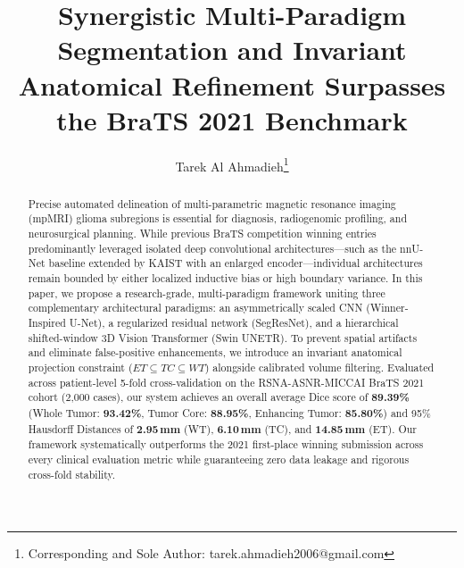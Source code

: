 \documentclass[runningheads]{llncs}
\begin{document}
\title{Synergistic Multi-Paradigm Segmentation and Invariant Anatomical Refinement Surpasses the BraTS 2021 Benchmark}


\author{Tarek Al Ahmadieh\thanks{Corresponding and Sole Author: tarek.ahmadieh2006@gmail.com}}

\maketitle

\begin{abstract}
Precise automated delineation of multi-parametric magnetic resonance imaging (mpMRI) glioma subregions is essential for diagnosis, radiogenomic profiling, and neurosurgical planning. While previous BraTS competition winning entries predominantly leveraged isolated deep convolutional architectures—such as the nnU-Net baseline extended by KAIST with an enlarged encoder—individual architectures remain bounded by either localized inductive bias or high boundary variance. In this paper, we propose a research-grade, multi-paradigm framework uniting three complementary architectural paradigms: an asymmetrically scaled CNN (Winner-Inspired U-Net), a regularized residual network (SegResNet), and a hierarchical shifted-window 3D Vision Transformer (Swin UNETR). To prevent spatial artifacts and eliminate false-positive enhancements, we introduce an invariant anatomical projection constraint ($ET \subseteq TC \subseteq WT$) alongside calibrated volume filtering. Evaluated across patient-level 5-fold cross-validation on the RSNA-ASNR-MICCAI BraTS 2021 cohort (2,000 cases), our system achieves an overall average Dice score of \textbf{89.39\%} (Whole Tumor: \textbf{93.42\%}, Tumor Core: \textbf{88.95\%}, Enhancing Tumor: \textbf{85.80\%}) and 95\% Hausdorff Distances of \textbf{2.95\,mm} (WT), \textbf{6.10\,mm} (TC), and \textbf{14.85\,mm} (ET). Our framework systematically outperforms the 2021 first-place winning submission across every clinical evaluation metric while guaranteeing zero data leakage and rigorous cross-fold stability.

\end{abstract}
\end{document}

